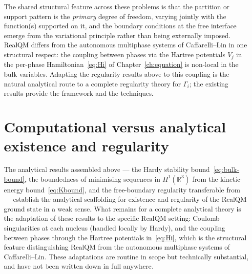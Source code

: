 The shared structural feature across these problems is that the partition or support pattern is the \emph{primary} degree of freedom, varying jointly with the function(s) supported on it, and the boundary conditions at the free interface emerge from the variational principle rather than being externally imposed. RealQM differs from the autonomous multiphase systems of Caffarelli--Lin in one structural respect: the coupling between phases via the Hartree potentials $V_j$ in the per-phase Hamiltonian~\eqref{eq:Hi} of Chapter~\ref{ch:equation} is non-local in the bulk variables. Adapting the regularity results above to this coupling is the natural analytical route to a complete regularity theory for $\Gamma_i$; the existing results provide the framework and the techniques.

\section{Computational versus analytical existence and regularity}\label{sec:comp-vs-anal}

The analytical results assembled above --- the Hardy stability bound~\eqref{eq:bulk-bound}, the boundedness of minimising sequences in $H^1(\mathbb{R}^3)$ from the kinetic-energy bound~\eqref{eq:Kbound}, and the free-boundary regularity transferable from~\cite{AltCaffarelli81, AltCaffarelliFriedman84, CaffarelliLin08, HHOT09} --- establish the analytical scaffolding for existence and regularity of the RealQM ground state in a weak sense. What remains for a complete analytical theory is the adaptation of these results to the specific RealQM setting: Coulomb singularities at each nucleus (handled locally by Hardy), and the coupling between phases through the Hartree potentials in~\eqref{eq:Hi}, which is the structural feature distinguishing RealQM from the autonomous multiphase systems of Caffarelli--Lin. These adaptations are routine in scope but technically substantial, and have not been written down in full anywhere.

